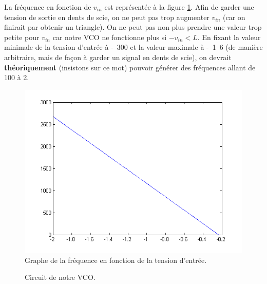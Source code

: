 La fréquence en fonction de $v_{in}$ est représentée à la figure
\ref{fig:f-vs-vin}. Afin de garder une tension de sortie
en dents de scie, on ne peut pas trop augmenter $v_{in}$ (car
on finirait par obtenir un triangle). On ne peut pas non
plus prendre une valeur trop petite pour $v_{in}$ car notre
VCO ne fonctionne plus si $-v_{in} < L$. En fixant
la valeur minimale de la tension d'entrée à \unit{-300}{\milli\volt} et la valeur
maximale à \unit{-1.6}{\volt} (de manière arbitraire, mais
de façon à garder un signal en dents de scie), on devrait
\textbf{théoriquement} (insistons sur ce mot) pouvoir générer 
des fréquences allant de \unit{100}{\hertz} à \unit{2}{\kilo\hertz}.

\begin{figure}[ht]
	\centering
	\includegraphics[scale=0.65]{img/freq-vs-vin.png}
	\caption{Graphe de la fréquence en fonction de la tension d'entrée.}
	\label{fig:f-vs-vin}
\end{figure}

\begin{figure}[ht]
	\centering
	\caption{Circuit de notre VCO.}
	\label{fig:circuit}
\end{figure}

